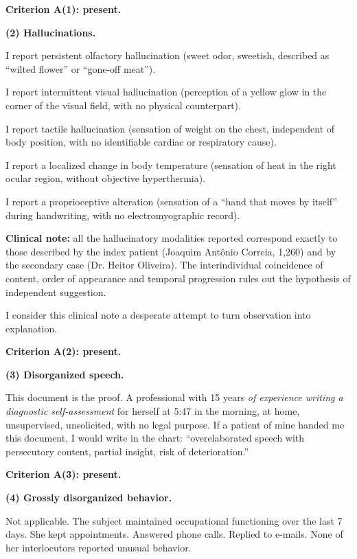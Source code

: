 \noindent \textbf{Criterion A(1): present.}

\noindent \textbf{(2) Hallucinations.}

\noindent I report persistent olfactory hallucination (sweet odor,
\noindent sweetish, described as ``wilted flower'' or ``gone-off meat'').

\noindent I report intermittent visual hallucination (perception of
\noindent a yellow glow in the corner of the visual field, with no physical counterpart).

\noindent I report tactile hallucination (sensation of weight on the chest,
\noindent independent of body position, with no identifiable cardiac or respiratory cause).

\noindent I report a localized change in body temperature
\noindent (sensation of heat in the right ocular region, without objective hyperthermia).

\noindent I report a proprioceptive alteration (sensation of a ``hand
\noindent that moves by itself'' during handwriting, with no electromyographic record).

\noindent \textbf{Clinical note:} all the hallucinatory modalities
\noindent reported correspond exactly to those described by the index patient
\noindent (Joaquim Antônio Correia, 1,260) and by the secondary case (Dr. Heitor
\noindent Oliveira). The interindividual coincidence of content, order of
\noindent appearance and temporal progression rules out the hypothesis of
\noindent independent suggestion.

\noindent I consider this clinical note a desperate attempt to
\noindent turn observation into explanation.

\noindent \textbf{Criterion A(2): present.}

\noindent \textbf{(3) Disorganized speech.}

\noindent This document is the proof. A professional with 15 years
\noindent \textit{of experience writing a diagnostic self-assessment} for herself
\noindent at 5:47 in the morning, at home, unsupervised, unsolicited, with
\noindent no legal purpose. If a patient of mine handed me this document,
\noindent I would write in the chart: ``overelaborated speech with persecutory
\noindent content, partial insight, risk of deterioration.''

\noindent \textbf{Criterion A(3): present.}

\noindent \textbf{(4) Grossly disorganized behavior.}

\noindent Not applicable. The subject maintained occupational
\noindent functioning over the last 7 days. She kept appointments. Answered
\noindent phone calls. Replied to e-mails. None of her interlocutors reported
\noindent unusual behavior.

